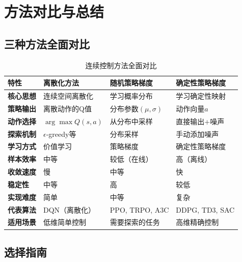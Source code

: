 \section{方法对比与总结}

\subsection{三种方法全面对比}

\begin{table}[H]
\centering
\caption{连续控制方法全面对比}
\begin{tabular}{p{}p{}p{}p{}}
\toprule
\textbf{特性} & \textbf{离散化方法} & \textbf{随机策略梯度} & \textbf{确定性策略梯度} \\
\midrule
\textbf{核心思想} & 连续空间离散化 & 学习概率分布 & 学习确定性映射 \\
\textbf{策略输出} & 离散动作的Q值 & 分布参数$(\mu, \sigma)$ & 动作向量$a$ \\
\textbf{动作选择} & $\arg\max Q(s,a)$ & 从分布中采样 & 直接输出+噪声 \\
\textbf{探索机制} & $\epsilon$-greedy等 & 分布采样 & 手动添加噪声 \\
\textbf{学习方式} & 价值学习 & 策略梯度 & 确定性策略梯度 \\
\textbf{样本效率} & 中等 & 较低（在线） & 高（离线） \\
\textbf{收敛速度} & 慢 & 中等 & 快 \\
\textbf{稳定性} & 中等 & 高 & 较低 \\
\textbf{实现难度} & 简单 & 中等 & 复杂 \\
\textbf{代表算法} & DQN（离散化） & PPO, TRPO, A3C & DDPG, TD3, SAC \\
\textbf{适用场景} & 低维简单控制 & 需要探索的任务 & 高维精确控制 \\
\bottomrule
\end{tabular}
\end{table}

\subsection{选择指南}

